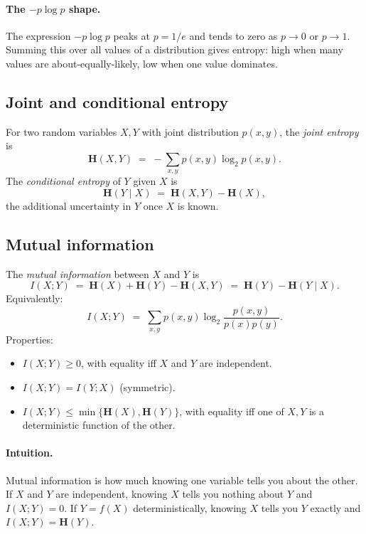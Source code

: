 \paragraph{The $-p \log p$ shape.} The expression $-p \log p$ peaks
at $p = 1/e$ and tends to zero as $p \to 0$ or $p \to 1$. Summing
this over all values of a distribution gives entropy: high when many
values are about-equally-likely, low when one value dominates.

\subsection*{Joint and conditional entropy}

For two random variables $X, Y$ with joint distribution $p(x, y)$,
the \emph{joint entropy} is
\[
  \mathbf{H}(X, Y) \;=\; -\sum_{x, y} p(x, y) \log_2 p(x, y).
\]
The \emph{conditional entropy} of $Y$ given $X$ is
\[
  \mathbf{H}(Y \mid X) \;=\; \mathbf{H}(X, Y) - \mathbf{H}(X),
\]
the additional uncertainty in $Y$ once $X$ is known.

\subsection*{Mutual information}

The \emph{mutual information} between $X$ and $Y$ is
\[
  I(X; Y) \;=\; \mathbf{H}(X) + \mathbf{H}(Y) - \mathbf{H}(X, Y)
  \;=\; \mathbf{H}(Y) - \mathbf{H}(Y \mid X).
\]
Equivalently:
\[
  I(X; Y) \;=\; \sum_{x, y} p(x, y) \log_2 \frac{p(x, y)}{p(x)
  p(y)}.
\]
Properties:

\begin{itemize}[leftmargin=1.5em,itemsep=2pt]
  \item $I(X; Y) \geq 0$, with equality iff $X$ and $Y$ are
    independent.
  \item $I(X; Y) = I(Y; X)$ (symmetric).
  \item $I(X; Y) \leq \min\{\mathbf{H}(X), \mathbf{H}(Y)\}$, with
    equality iff one of $X, Y$ is a deterministic function of the
    other.
\end{itemize}

\paragraph{Intuition.} Mutual information is how much knowing one
variable tells you about the other. If $X$ and $Y$ are independent,
knowing $X$ tells you nothing about $Y$ and $I(X; Y) = 0$. If $Y =
f(X)$ deterministically, knowing $X$ tells you $Y$ exactly and $I(X;
Y) = \mathbf{H}(Y)$.

